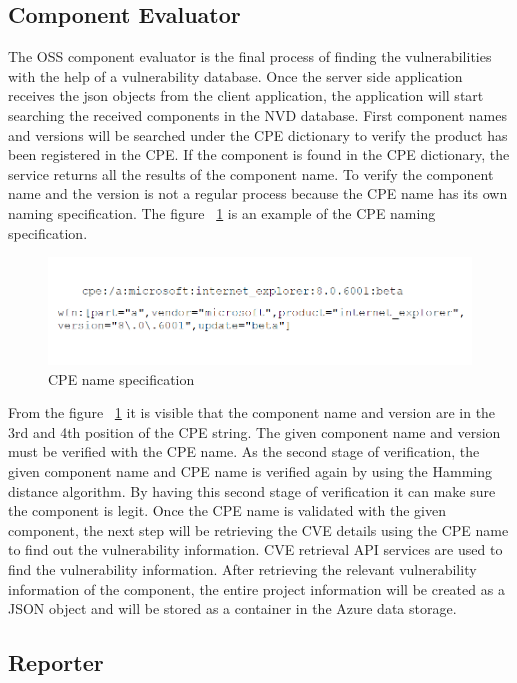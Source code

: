 \subsection{Component Evaluator}
The OSS component evaluator is the final process of finding the vulnerabilities with the help of a vulnerability database. Once the server side application receives the json objects from the client application, the application will start searching the received components in the NVD database. First component names and versions will be searched under the CPE dictionary to verify the product has been registered in the CPE. If the component is found in the CPE dictionary, the service returns all the results of the component name. To verify the component name and the version is not a regular process because the CPE name has its own naming specification. The figure ~\ref{fig:cpe_name} is an example of the CPE naming specification.
 \begin{figure}[h!]
	\includegraphics[width=15cm]{includes/cpe_name.png}
	\centering
	\caption{CPE name specification}
	\label{fig:cpe_name}
\end{figure}
From the figure ~\ref{fig:cpe_name} it is visible that the component name and version are in the 3rd and 4th position of the CPE string. The given component name and version must be verified with the CPE name. As the second stage of verification, the given component name and CPE name is verified again by using the Hamming distance algorithm. By having this second stage of verification it can make sure the component is legit. Once the CPE name is validated with the given component, the next step will be retrieving the CVE details using the CPE name to find out the vulnerability information. CVE retrieval API services are used to find the vulnerability information. After retrieving the relevant vulnerability information of the component, the entire project information will be created as a JSON object and will be stored as a container in the Azure data storage.                                                                                                                 
\subsection{Reporter}
%

